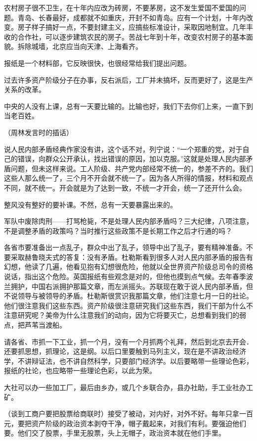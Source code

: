 农村房子很不卫生，在十年内应改为砖房，不要茅房，这不发生爱国不爱国的问题。青岛、长春最好，成都就不如重庆，开封不如青岛。应有一个计划，十年内改变。房子样子搞好一点，不要封建主义，应搞些标准设计，采取因地制宜。几年丰收的合作社，可以逐步建筑农民的房子。苦战七年到十年，改变农村房子的基本面貌。拆除城墙，北京应当向天津、上海看齐。

报纸是一个材料部，它反映很快，也很经常给我们提出问题。

过去许多资产阶级分子在办事，反右派后，工厂并未搞坏，反而更好了，这是生产关系的改革。

中央的人没有上课，总有一天要比输的。比输也好，我们下去你们上来，一直下到当老百姓。

（周林发言时的插话）

说人民内部矛盾经典作家没有讲，这个话不对，列宁说：“一个郑重的党，对于自己的错误，向群众公开承认，找出错误的原因，加以克服。”这就是处理人民内部矛盾问题，但未这样来说。工人阶级、共产党内部经常不统一的，参差不齐的。我们这些人那么统一了，三个月不开会就不统一了。因为各人所得的情报，材料和观点不同，就不统一。开会就是为了达到一致，不统一才开会，统一了还开什么会。

整风没有整好的要补课。不然，总有一天要暴露出来的。

军队中废除肉刑——打骂枪毙，不是处理人民内部矛盾吗？三大纪律，八项注意，不是调整矛盾的政策吗？当时推行这些政策不是长期工作之后才行通的吗？

各省市要准备出一点乱子，群众中出了乱子，领导中出了乱子，要有精神准备。不要采取赫鲁晓夫式的答复：没有矛盾。杜勒斯看到很多人对人民内部矛盾的报告有幻想，他读了几遍，他看见抱有幻想很危险，他就以全世界资产阶级总司令的资格说话，指出这个危险。英国报纸有些观念是对的，但他也摸到点气候。去年春季波兰拥护，中国右派拥护那篇文章，而左派摇头。苏联现在敢于说人民内部矛盾，但不说领导与被领导的矛盾。杜勒斯很赏识我那篇文章，他们注意七月一日的社论。他们很注意我们这些东西。资产阶级很注意研究我们这些东西，我们干部为什么不注意研究呢？美帝为什么注意我们的动向，因为它将要灭亡，总想看到我们的弱点，把芦苇当渡船。

请各省、市抓一下工业，抓一个月，没有一个月抓两个礼拜，然后到北京去开会．还要抓思想，抓理论，这是纲。以后口里要触到马列主义，现在是不讲政治经济学，不讲辩证法，也不讲自然科学，只要部门经济学。以后要略带一些理论色彩，报纸的社论，也应略带一些理论色彩，以此为荣。

大社可以办一些加工厂，最后由乡办，或几个乡联合办，县办社助，手工业社办工矿。

（谈到工商户要把股票给商联时）接受了被动，对内好，对外不好。每年只拿一百元，要把资产阶级的政治资本剥夺干净，帽子戴起来，对我们有利。要强迫他们要。他们交了股票，手里无股票，头上无帽子，政治资本就在他们手里。


